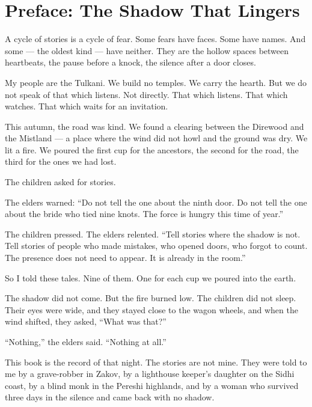 \documentclass[10pt,twoside]{book}
\begin{document}




\tableofcontents

\chapter*{Preface: The Shadow That Lingers}

A cycle of stories is a cycle of fear. Some fears have faces. Some have names. And some --- the oldest kind --- have neither. They are the hollow spaces between heartbeats, the pause before a knock, the silence after a door closes.

My people are the Tulkani. We build no temples. We carry the hearth. But we do not speak of that which listens. Not directly. That which listens. That which watches. That which waits for an invitation.

This autumn, the road was kind. We found a clearing between the Direwood and the Mistland --- a place where the wind did not howl and the ground was dry. We lit a fire. We poured the first cup for the ancestors, the second for the road, the third for the ones we had lost.

The children asked for stories.

The elders warned: ``Do not tell the one about the ninth door. Do not tell the one about the bride who tied nine knots. The force is hungry this time of year.''

The children pressed. The elders relented. ``Tell stories where the shadow is not. Tell stories of people who made mistakes, who opened doors, who forgot to count. The presence does not need to appear. It is already in the room.''

So I told these tales. Nine of them. One for each cup we poured into the earth.

The shadow did not come. But the fire burned low. The children did not sleep. Their eyes were wide, and they stayed close to the wagon wheels, and when the wind shifted, they asked, ``What was that?''

``Nothing,'' the elders said. ``Nothing at all.''

This book is the record of that night. The stories are not mine. They were told to me by a grave-robber in Zakov, by a lighthouse keeper's daughter on the Sidhi coast, by a blind monk in the Pereshi highlands, and by a woman who survived three days in the silence and came back with no shadow.
\end{document}
